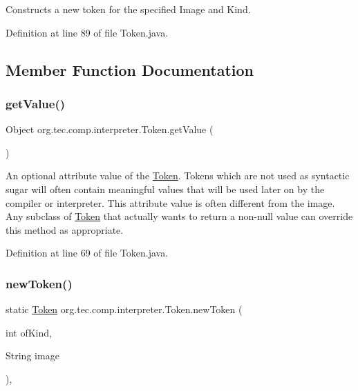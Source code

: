 Constructs a new token for the specified Image and Kind. 

Definition at line 89 of file Token.\+java.



\subsection{Member Function Documentation}
\mbox{\label{classorg_1_1tec_1_1comp_1_1interpreter_1_1_token_adda9288eca7f330e9f34ddf78ee3d612}} 
\subsubsection{\texorpdfstring{get\+Value()}{getValue()}}
{\footnotesize\ttfamily Object org.\+tec.\+comp.\+interpreter.\+Token.\+get\+Value (\begin{DoxyParamCaption}{ }\end{DoxyParamCaption})\hspace{0.3cm}{\ttfamily [inline]}}

An optional attribute value of the \mbox{\hyperlink{classorg_1_1tec_1_1comp_1_1interpreter_1_1_token}{Token}}. Tokens which are not used as syntactic sugar will often contain meaningful values that will be used later on by the compiler or interpreter. This attribute value is often different from the image. Any subclass of \mbox{\hyperlink{classorg_1_1tec_1_1comp_1_1interpreter_1_1_token}{Token}} that actually wants to return a non-\/null value can override this method as appropriate. 

Definition at line 69 of file Token.\+java.

\mbox{\label{classorg_1_1tec_1_1comp_1_1interpreter_1_1_token_a50b3408b27556c1a3958c71bc8b219ff}} 
\subsubsection{\texorpdfstring{new\+Token()}{newToken()}\hspace{0.1cm}{\footnotesize\ttfamily [1/2]}}
{\footnotesize\ttfamily static \mbox{\hyperlink{classorg_1_1tec_1_1comp_1_1interpreter_1_1_token}{Token}} org.\+tec.\+comp.\+interpreter.\+Token.\+new\+Token (\begin{DoxyParamCaption}\item[{int}]{of\+Kind,  }\item[{String}]{image }\end{DoxyParamCaption})\hspace{0.3cm}{\ttfamily [inline]}, {\ttfamily [static]}}


